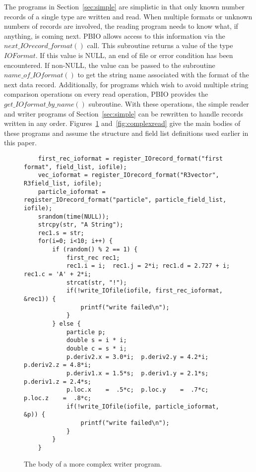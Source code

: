 \documentclass{article}
\begin{document}
The programs in Section~\ref{sec:simple} are simplistic in that only known
number records of a single type are written and read.  When multiple formats
or unknown numbers of records are involved, the reading program needs to know
what, if anything, is coming next.  PBIO allows access to this information via
the $next\_IOrecord\_format()$ call.  This subroutine returns a value of the
type $IOFormat$.  If this value is NULL, an end of file or error condition has
been encountered.  If non-NULL, the value can be passed to the subroutine
$name\_of\_IOformat()$ to get the string name associated with the format of
the next data record.  Additionally, for programs which wish to avoid multiple
string comparison operations on every read operation, PBIO provides the
$get\_IOformat\_by\_name()$ subroutine.  With these operations, the simple
reader and writer programs of Section~\ref{sec:simple} can be rewritten to
handle records written in any order.  Figures~\ref{fig:complexwrite}
and~\ref{fig:complexread} give the main bodies of these programs and assume the
structure and field list definitions used earlier in this paper.
\begin{figure}
\begin{verbatim}
    first_rec_ioformat = register_IOrecord_format("first format", field_list, iofile);
    vec_ioformat = register_IOrecord_format("R3vector", R3field_list, iofile);
    particle_ioformat = register_IOrecord_format("particle", particle_field_list, iofile);
    srandom(time(NULL));
    strcpy(str, "A String");
    rec1.s = str;
    for(i=0; i<10; i++) {
        if (random() % 2 == 1) {
            first_rec rec1;
            rec1.i = i;  rec1.j = 2*i; rec1.d = 2.727 + i; rec1.c = 'A' + 2*i;
            strcat(str, "!");
            if(!write_IOfile(iofile, first_rec_ioformat, &rec1)) {
                printf("write failed\n");
            }
        } else {
            particle p;
            double s = i * i;
            double c = s * i;
            p.deriv2.x = 3.0*i;  p.deriv2.y = 4.2*i;  p.deriv2.z = 4.8*i;
            p.deriv1.x = 1.5*s;  p.deriv1.y = 2.1*s;  p.deriv1.z = 2.4*s;
            p.loc.x    =  .5*c;  p.loc.y    =  .7*c;  p.loc.z    =  .8*c;
            if(!write_IOfile(iofile, particle_ioformat, &p)) {
                printf("write failed\n");
            }
        }
    }
\end{verbatim}
\caption{The body of a more complex writer program.\label{fig:complexwrite}}
\end{figure}
\end{document}
